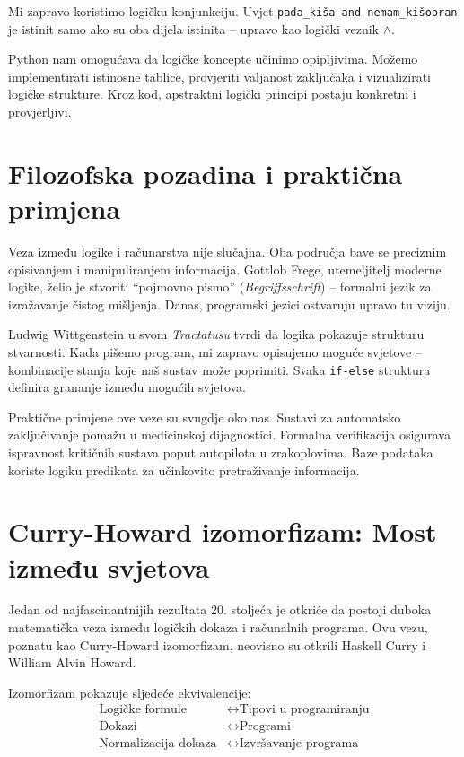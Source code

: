 Mi zapravo koristimo logičku konjunkciju. Uvjet \texttt{pada\_kiša and nemam\_kišobran} je istinit samo ako su oba dijela istinita -- upravo kao logički veznik $\wedge$.

Python nam omogućava da logičke koncepte učinimo opipljivima. Možemo implementirati istinosne tablice, provjeriti valjanost zaključaka i vizualizirati logičke strukture. Kroz kod, apstraktni logički principi postaju konkretni i provjerljivi.

\section*{Filozofska pozadina i praktična primjena}

Veza između logike i računarstva nije slučajna. Oba područja bave se preciznim opisivanjem i manipuliranjem informacija. Gottlob Frege, utemeljitelj moderne logike, želio je stvoriti ``pojmovno pismo'' (\textit{Begriffsschrift}) -- formalni jezik za izražavanje čistog mišljenja. Danas, programski jezici ostvaruju upravo tu viziju.

Ludwig Wittgenstein u svom \textit{Tractatusu} tvrdi da logika pokazuje strukturu stvarnosti. Kada pišemo program, mi zapravo opisujemo moguće svjetove -- kombinacije stanja koje naš sustav može poprimiti. Svaka \texttt{if-else} struktura definira grananje između mogućih svjetova.

Praktične primjene ove veze su svugdje oko nas. Sustavi za automatsko zaključivanje pomažu u medicinskoj dijagnostici. Formalna verifikacija osigurava ispravnost kritičnih sustava poput autopilota u zrakoplovima. Baze podataka koriste logiku predikata za učinkovito pretraživanje informacija.


\section*{Curry-Howard izomorfizam: Most između svjetova}

Jedan od najfascinantnijih rezultata 20. stoljeća je otkriće da postoji duboka matematička veza između logičkih dokaza i računalnih programa. Ovu vezu, poznatu kao Curry-Howard izomorfizam, neovisno su otkrili Haskell Curry i William Alvin Howard.

Izomorfizam pokazuje sljedeće ekvivalencije:
\begin{align}
\text{Logičke formule} &\leftrightarrow \text{Tipovi u programiranju}\\
\text{Dokazi} &\leftrightarrow \text{Programi}\\
\text{Normalizacija dokaza} &\leftrightarrow \text{Izvršavanje programa}
\end{align}

